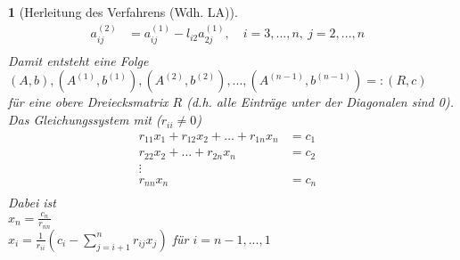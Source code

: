\documentclass[12pt]{article}
\theoremstyle{break}
\newtheorem{nothing}[theorem]{}
\begin{document}
\begin{nothing}[Herleitung des Verfahrens (Wdh. LA)]
\begin{align*}
a_{ij}^{(2)} &= a_{ij}^{(1)} - l_{i2} a_{2j}^{(1)}, \quad i=3,...,n, \medspace j=2,...,n &\\
\end{align*}
%
Damit entsteht eine Folge\\ 
$(A, b), (A^{(1)}, b^{(1)}), (A^{(2)}, b^{(2)}),..., (A^{(n-1)}, b^{(n-1)}) =: (R,c)$\\
für eine obere Dreiecksmatrix $R$ (d.h. alle Einträge unter der Diagonalen sind 0).\\
Das Gleichungssystem mit ($r_{ii} \neq 0$)\\
%
\begin{align*}
r_{11}x_1 + r_{12}x_2 + \dots + r_{1n}x_n &= c_1 &\\
r_{22}x_2 + \dots + r_{2n}x_n &= c_2 &\\
\vdots& &\\
r_{nn}x_n &= c_{n} &\\
\end{align*}
%
Dabei ist\\
$x_n = \frac{c_n}{r_{nn}}$\\
$x_i = \frac{1}{r_{ii}}(c_i - \sum_{j=i+1}^n r_{ij}x_j)$ für $i=n-1,...,1$
\end{nothing}
\end{document}
